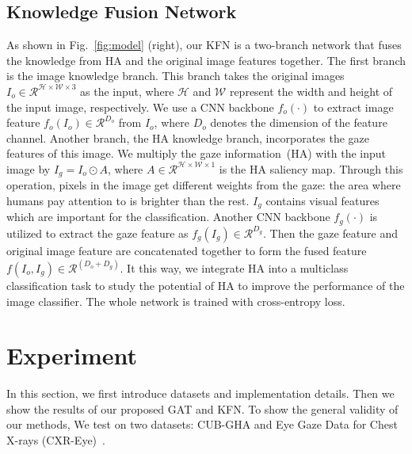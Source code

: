 \documentclass{bmvc2k}
\begin{document}
\subsection{Knowledge Fusion Network}
\label{sec:KFN}
As shown in Fig.\ \ref{fig:model} (right), our KFN is a two-branch network that fuses the knowledge from HA and the original image features together.
The first branch is the image knowledge branch. This branch takes the original images $I_o \in \mathcal{R}^{\mathcal{H} \times \mathcal{W} \times 3}$ as the input, where $\mathcal{H}$ and $\mathcal{W}$ represent the width and height of the input image, respectively. We use a CNN backbone $f_o(\cdot)$ to extract image feature $f_o(I_o) \in \mathcal{R}^{D_o}$ from $I_o$, where $D_o$ denotes the dimension of the feature channel. Another branch, the HA knowledge branch, incorporates the gaze features of this image. We multiply the gaze information~(HA) with the input image by $I_g = I_o \odot A$, where $A \in \mathcal{R}^{\mathcal{H} \times \mathcal{W} \times 1}$ is the HA saliency map. Through this operation, pixels in the image get different weights from the gaze: the area where humans pay attention to is brighter than the rest. $I_g$ contains visual features which are important for the classification. Another CNN backbone $f_g(\cdot)$ is utilized to extract the gaze feature as $f_g(I_g) \in \mathcal{R}^{D_g}$. Then the gaze feature and original image feature are concatenated together to form the fused feature $f(I_o, I_g) \in \mathcal{R}^{(D_o+D_g)}$. It this way, we integrate HA into a multiclass classification task to study the potential of HA to improve the performance of the image classifier. The whole network is trained with cross-entropy loss.








\section{Experiment}
\label{sec:experiments}
In this section, we first introduce datasets and implementation details. Then we show the results of our proposed GAT and KFN. To show the general validity of our methods, We test on two datasets: CUB-GHA and Eye Gaze Data for Chest X-rays (CXR-Eye)\ \cite{Karargyris2020}. 
\end{document}
